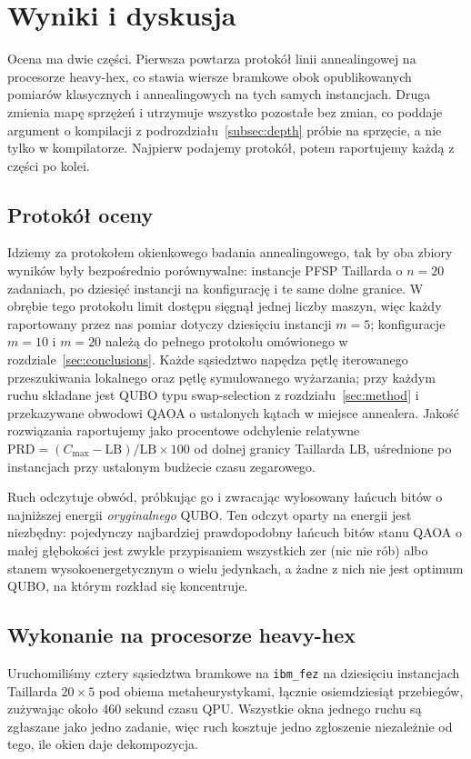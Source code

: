 \documentclass[11pt,a4paper]{article}
\begin{document}
\section{Wyniki i dyskusja}
\label{sec:results}
Ocena ma dwie części. Pierwsza powtarza protokół linii annealingowej na
procesorze heavy-hex, co stawia wiersze bramkowe obok opublikowanych pomiarów
klasycznych i annealingowych na tych samych instancjach. Druga zmienia mapę
sprzężeń i utrzymuje wszystko pozostałe bez zmian, co poddaje argument
o kompilacji z podrozdziału~\ref{subsec:depth} próbie na sprzęcie, a nie tylko
w kompilatorze. Najpierw podajemy protokół, potem raportujemy każdą z części
po kolei.

\subsection{Protokół oceny}
\label{subsec:protocol}
Idziemy za protokołem okienkowego badania annealingowego, tak by oba zbiory
wyników były bezpośrednio porównywalne: instancje PFSP Taillarda o $n=20$
zadaniach, po dziesięć instancji na konfigurację i te same dolne granice.
W obrębie tego protokołu limit dostępu sięgnął jednej liczby maszyn, więc każdy
raportowany przez nas pomiar dotyczy dziesięciu instancji $m=5$; konfiguracje
$m=10$ i $m=20$ należą do pełnego protokołu omówionego
w rozdziale~\ref{sec:conclusions}. Każde sąsiedztwo napędza pętlę iterowanego przeszukiwania
lokalnego oraz pętlę symulowanego wyżarzania; przy każdym ruchu składane jest
QUBO typu swap-selection z rozdziału~\ref{sec:method} i przekazywane obwodowi
QAOA o ustalonych kątach w miejsce annealera. Jakość rozwiązania raportujemy
jako procentowe odchylenie relatywne
$\mathrm{PRD}=(C_{\max}-\mathrm{LB})/\mathrm{LB}\times100$ od dolnej granicy
Taillarda $\mathrm{LB}$, uśrednione po instancjach przy ustalonym budżecie
czasu zegarowego.

Ruch odczytuje obwód, próbkując go i zwracając wylosowany łańcuch bitów
o najniższej energii \emph{oryginalnego} QUBO. Ten odczyt oparty na energii
jest niezbędny: pojedynczy najbardziej prawdopodobny łańcuch bitów stanu QAOA
o małej głębokości jest zwykle przypisaniem wszystkich zer (nic nie rób) albo
stanem wysokoenergetycznym o wielu jedynkach, a żadne z nich nie jest optimum
QUBO, na którym rozkład się koncentruje.

\subsection{Wykonanie na procesorze heavy-hex}
\label{subsec:hwresults}
Uruchomiliśmy cztery sąsiedztwa bramkowe na \texttt{ibm\_fez} na dziesięciu
instancjach Taillarda $20\times5$ pod obiema metaheurystykami, łącznie
osiemdziesiąt przebiegów, zużywając około 460 sekund czasu QPU. Wszystkie okna
jednego ruchu są zgłaszane jako jedno zadanie, więc ruch kosztuje jedno
zgłoszenie niezależnie od tego, ile okien daje dekompozycja.
\end{document}
